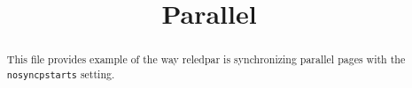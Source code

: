 \documentclass{article}
\begin{document}
\date{}
\title{Parallel}
\maketitle

\begin{abstract}
This file provides example of the way reledpar is synchronizing parallel pages with the \verb+nosyncpstarts+ setting.
\end{abstract}


\begin{pages}
    \begin{Leftside}
        \beginnumbering
           \autopar
           \Blindtext[20][2]
        \endnumbering
    \end{Leftside}
    \begin{Rightside}
        \beginnumbering
            \autopar
           \Blindtext[20][3]
        \endnumbering
    \end{Rightside}

\end{pages} 
\Pages
\end{document}
